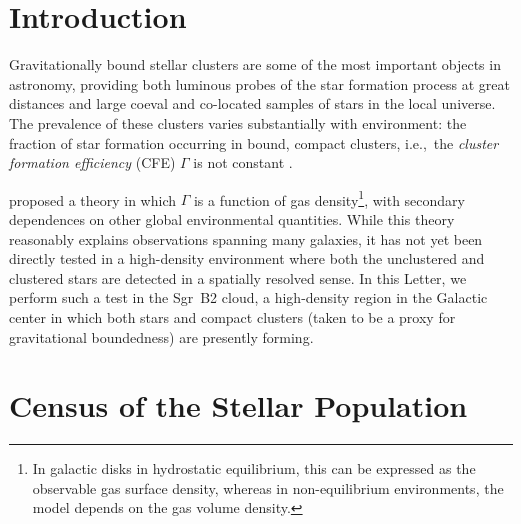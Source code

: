 \documentclass[twocolumn]{aastex62}
\begin{document}
\section{Introduction}
Gravitationally bound stellar clusters are some of the most important objects
in astronomy, providing both luminous probes of the star formation process at
great distances \citep[e.g.,][among many
others]{Brodie2006a,Adamo2013b,Kruijssen2018b,Kruijssen2018a} and large coeval
and co-located samples of stars in the local universe.  The prevalence of these
clusters varies substantially with environment: the fraction of star formation
occurring in bound, compact clusters, i.e.,~the \emph{cluster formation
efficiency} (CFE) $\Gamma$ is not constant
\citep{Adamo2015a,Johnson2016a,Messa2018a}.

\citet{Kruijssen2012a} proposed a theory in which $\Gamma$ is a function of gas
density\footnote{In galactic disks in hydrostatic equilibrium, this can be
expressed as the observable gas surface density, whereas in non-equilibrium
environments, the model depends on the gas volume density.}, with secondary
dependences on other global environmental quantities.  While this theory
reasonably explains observations spanning many galaxies, it has not yet been
directly tested in a
high-density environment where both the unclustered and clustered stars are
detected in a spatially resolved sense.  In this Letter, we perform such a test
in the Sgr~B2 cloud, a high-density region in the Galactic center in which both
stars and compact clusters (taken to be a proxy for gravitational boundedness)
are presently forming.


\section{Census of the Stellar Population}
\end{document}
